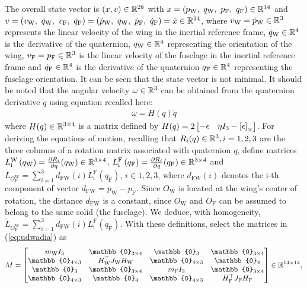 The overall state vector is $(x,v) \in {\mathbb R}^{28}$ with $x=(p_{\text{W}},~q_{\text{W}},~p_{\text{F}},~q_{\text{F}}) \in {\mathbb R}^{14}$ and $v=(v_{\text{W}},~\dot{q}_{\text{W}},~v_{\text{F}},~\dot{q}_{\text{F}}) = (\dot{p}_{\text{W}},~\dot{q}_{\text{W}},~\dot{p}_{\text{F}},~\dot{q}_{\text{F}})=\dot{x} \in {\mathbb R}^{14}$, where $v_{\text{W}} = \dot{p}_{\text{W}} \in {\mathbb R}^{3}$ represents the linear velocity of the wing in the inertial reference frame, $\dot{q}_{\text{W}} \in {\mathbb R}^{4}$ is the derivative of the quaternion, $q_{\text{W}} \in {\mathbb R}^{4}$ representing the orientation of the wing, $v_{\text{F}} =p_{\text{F}} \in {\mathbb R}^{3}$ is the linear velocity of the fuselage in the inertial reference frame and $\dot{q}_{\text{F}} \in {\mathbb R}^{4}$ is the derivative of the quaternion $q_{\text{F}} \in {\mathbb R}^{4}$ representing the fuselage orientation. It can be seen that the state vector is not minimal. It should be noted that the angular velocity $\omega \in {\mathbb R}^{3}$ can be obtained from the quaternion derivative $\dot{q}$ using equation  \cite[equation (2.7)]{udwadia-schutte} recalled here: 
\begin{align*}
    \omega = H(q) \dot{q} 
\end{align*}
where $H(q) \in {\mathbb R}^{3\times4}$ is a matrix defined by $H(q) = 2\begin{bmatrix}-\epsilon & \eta I_{3} - \left[\epsilon\right]_{\times}\end{bmatrix}$.
For deriving the equations of motion, recalling that $R_{i}(q) \in {\mathbb R}^{3}, i = 1,2,3$ are the three columns of a rotation matrix associated with quaternion $q$, define matrices  $L_{\text{i}}^{\text{W}} \left( q_{\text{W}} \right) = \frac{\partial R_{i}}{\partial q}(q_{\text{W}}) \in {\mathbb R}^{3\times4}$, 
$L_{\text{i}}^{\text{F}} \left( q_{\text{F}} \right) = \frac{\partial R_{i}}{\partial q}(q_{\text{F}}) \in {\mathbb R}^{3\times4}$ and
$L_{O_{\text{F}}^{\text{W}}} = \sum_{i=1}^{3} d_{\text{FW}}(i) L_{\text{i}}^{\text{F}} (q_{\text{F}})$, $i \in {1,2,3}$, where $d_{\text{FW}}(i)$ denotes the i-th component of vector $d_{\text{FW}} = p_{\text{W}} - p_{\text{F}}$. Since $O_{\text{W}}$ is located at the wing's center of rotation, the distance $d_{\text{FW}}$ is a constant, since $O_{\text{W}}$ and $O_{\text{F}}$ can be assumed to belong to the same solid (the fuselage). We deduce, with homogeneity, $\dot{L}_{O_{\text{F}}^{\text{W}}} = \sum_{i=1}^{3} d_{\text{FW}}(i) L_{\text{i}}^{\text{F}} (\dot{q}_{\text{F}})$. With these definitions, select the matrices in (\ref{eq:udwadia}) as
\begin{align}
    M = \begin{bmatrix}
        m_{\text{W}} I_{3} & \mathbb{0}_{3 \times 4} & \mathbb{0}_{3} & \mathbb{0}_{3 \times 4}\\
        \mathbb{0}_{4 \times 3} & H_{\text{W}}^\top J_{\text{W}} H_{\text{W}} & \mathbb{0}_{4 \times 3} & \mathbb{0}_{4}\\
        \mathbb{0}_{3} & \mathbb{0}_{3 \times 4} & m_{\text{F}} I_{3} & \mathbb{0}_{3 \times 4} \\
        \mathbb{0}_{4 \times 3} & \mathbb{0}_{4 } & \mathbb{0}_{4 \times 3} & H_{\text{F}}^\top J_{\text{F}} H_{\text{F}}    \end{bmatrix}\in \real^{14\times14},
\end{align}
